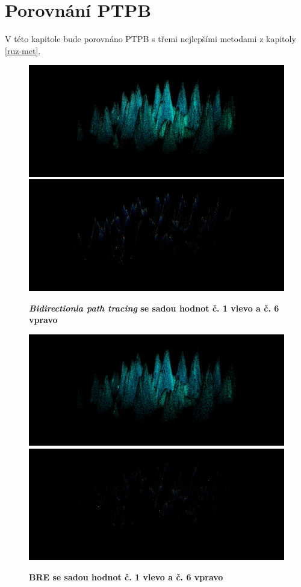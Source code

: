 \section{Porovnání PTPB}
V této kapitole bude porovnáno PTPB s třemi nejlepšími metodami z kapitoly \ref{ruz-met}.
\begin{figure}[H]\centering
\includegraphics[width=0.5\linewidth]{obrazky-figures/vysledky_upbp_bpt_3600.png}\hfill
\includegraphics[width=0.5\linewidth]{obrazky-figures/vysledky-bpt-6-3h.png}
\hfill
  \caption{\textbf{\textit{Bidirectionla path tracing} se sadou hodnot č. 1 vlevo a č. 6  vpravo}}
  \label{mereni-6-bpt}
\end{figure}
\begin{figure}[H]\centering
\includegraphics[width=0.5\linewidth]{obrazky-figures/vysledky_upbp_ptls_3600.png}\hfill
\includegraphics[width=0.5\linewidth]{obrazky-figures/vysledky-ptls-6-3h.png}
\hfill
  \caption{\textbf{BRE se sadou hodnot č. 1 vlevo a č. 6  vpravo}}
  \label{mereni-6-bre}
\end{figure}
